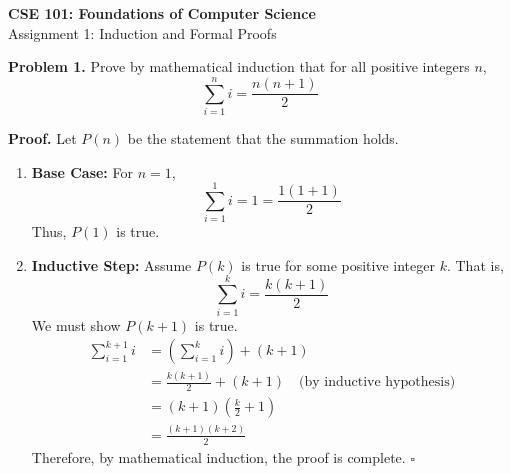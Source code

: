 \documentclass[12pt]{article}
\begin{document}
\begin{center}
    {\LARGE \bfseries CSE 101: Foundations of Computer Science} \\
    \vspace{0.2cm}
    {\large Assignment 1: Induction and Formal Proofs}
\end{center}

\vspace{0.5cm}

\textbf{Problem 1.} Prove by mathematical induction that for all positive integers $n$,
\begin{equation*}
    \sum_{i=1}^n i = \frac{n(n+1)}{2}
\end{equation*}

\textbf{Proof.}
Let $P(n)$ be the statement that the summation holds.
\begin{enumerate}
    \item \textbf{Base Case:} For $n=1$,
    \begin{equation*}
        \sum_{i=1}^1 i = 1 = \frac{1(1+1)}{2}
    \end{equation*}
    Thus, $P(1)$ is true.
    
    \item \textbf{Inductive Step:} Assume $P(k)$ is true for some positive integer $k$. That is,
    \begin{equation*}
        \sum_{i=1}^k i = \frac{k(k+1)}{2}
    \end{equation*}
    We must show $P(k+1)$ is true.
    \begin{align*}
        \sum_{i=1}^{k+1} i &= \left(\sum_{i=1}^k i\right) + (k+1) \\
        &= \frac{k(k+1)}{2} + (k+1) \quad \text{(by inductive hypothesis)} \\
        &= (k+1) \left(\frac{k}{2} + 1\right) \\
        &= \frac{(k+1)(k+2)}{2}
    \end{align*}
    Therefore, by mathematical induction, the proof is complete. \hfill $\square$
\end{enumerate}
\end{document}
